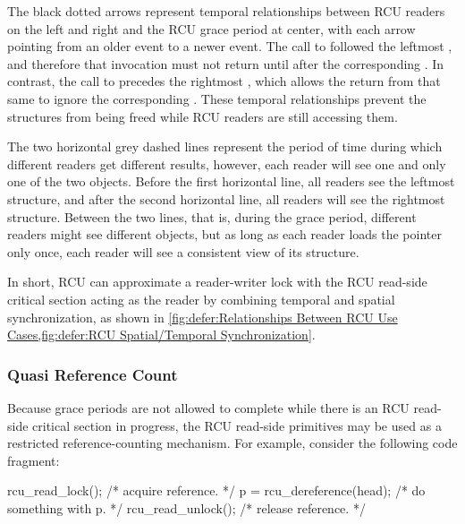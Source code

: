 The black dotted arrows represent temporal relationships between RCU readers
on the left and right and the RCU grace period at center, with each
arrow pointing from an older event to a newer event.
The call to  followed the leftmost ,
and therefore that  invocation must not return
until after the corresponding .
In contrast, the call to  precedes the
rightmost , which allows the return from that same
 to ignore the corresponding .
These temporal relationships prevent the  structures from
being freed while RCU readers are still accessing them.

The two horizontal grey dashed lines represent the period of time during
which different readers get different results, however, each reader
will see one and only one of the two objects.
Before the first horizontal line, all readers see the leftmost
 structure, and after the second horizontal line, all
readers will see the rightmost structure.
Between the two lines, that is, during the grace period, different
readers might see different objects, but as long as each reader
loads the  pointer only once, each reader will see
a consistent view of its  structure.

In short, RCU can approximate a reader-writer lock with the RCU read-side
critical section acting as the reader by combining temporal and spatial
synchronization, as shown in
\cref{fig:defer:Relationships Between RCU Use Cases,fig:defer:RCU Spatial/Temporal Synchronization}.

\subsubsection{Quasi Reference Count}
\label{sec:defer:Quasi Reference Count}

Because grace periods are not allowed to complete while
there is an RCU read-side critical section in progress,
the RCU read-side primitives may be used as a restricted
reference-counting mechanism.
For example, consider the following code fragment:

\begin{VerbatimN}
rcu_read_lock();  /* acquire reference. */
p = rcu_dereference(head);
/* do something with p. */
rcu_read_unlock();  /* release reference. */
\end{VerbatimN}

